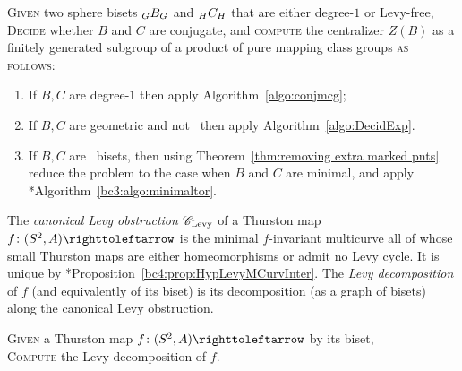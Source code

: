 \documentclass{amsart}
\begin{document}
\begin{algo}\label{algo:conj:LevyFree}
  \textsc{Given} two sphere bisets $\subscript {G}B_{G}$ and  $\subscript {H}C_{H}$ that are either degree-$1$ or Levy-free,\\
  \textsc{Decide} whether $B$ and $C$ are conjugate, and \textsc{compute} the centralizer $Z(B)$ as a finitely generated subgroup of a product of pure mapping class groups \textsc{as follows:}\\\upshape
  \begin{enumerate}
  \item If $B,C$ are degree-$1$ then apply Algorithm~\ref{algo:conjmcg};
  \item If $B,C$ are geometric and not \Tor\ then apply Algorithm~\ref{algo:DecidExp}.
  \item If $B,C$ are \Tor\ bisets, then using
    Theorem~\ref{thm:removing extra marked pnts} reduce the problem to
    the case when $B$ and $C$ are minimal, and apply
    \cite{bartholdi-dudko:bc3}*{Algorithm~\ref{bc3:algo:minimaltor}}.
  \end{enumerate}
\end{algo}

The \emph{canonical Levy obstruction} ${\mathscr C}_{\text{Levy}}$ of a
Thurston map $f\colon(S^2,A)\selfmap$ is the minimal $f$-invariant
multicurve all of whose small Thurston maps are either homeomorphisms
or admit no Levy cycle. It is unique by
\cite{bartholdi-dudko:bc4}*{Proposition~\ref{bc4:prop:HypLevyMCurvInter}}. The
\emph{Levy decomposition} of $f$ (and equivalently of its biset) is
its decomposition (as a graph of bisets) along the canonical Levy
obstruction.

\begin{algo}\label{algo:decidelevy}
  \textsc{Given} a Thurston map $f\colon(S^2,A)\selfmap$ by its biset,\\
  \textsc{Compute} the Levy decomposition of $f$.
\end{algo}
\end{document}
